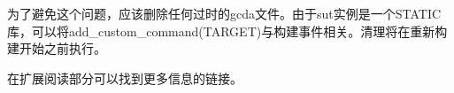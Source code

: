 为了避免这个问题，应该删除任何过时的gcda文件。由于sut实例是一个STATIC库，可以将add\_custom\_command(TARGET)与构建事件相关。清理将在重新构建开始之前执行。

在扩展阅读部分可以找到更多信息的链接。























































